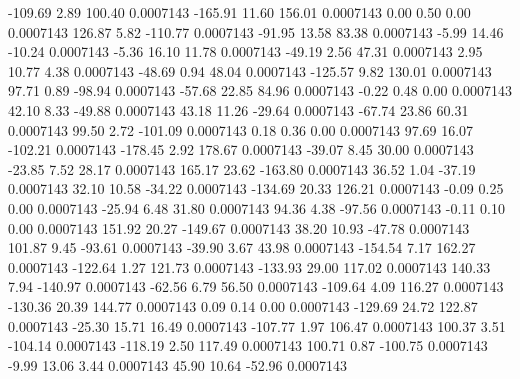      -109.69        2.89      100.40     0.0007143
     -165.91       11.60      156.01     0.0007143
        0.00        0.50        0.00     0.0007143
      126.87        5.82     -110.77     0.0007143
      -91.95       13.58       83.38     0.0007143
       -5.99       14.46      -10.24     0.0007143
       -5.36       16.10       11.78     0.0007143
      -49.19        2.56       47.31     0.0007143
        2.95       10.77        4.38     0.0007143
      -48.69        0.94       48.04     0.0007143
     -125.57        9.82      130.01     0.0007143
       97.71        0.89      -98.94     0.0007143
      -57.68       22.85       84.96     0.0007143
       -0.22        0.48        0.00     0.0007143
       42.10        8.33      -49.88     0.0007143
       43.18       11.26      -29.64     0.0007143
      -67.74       23.86       60.31     0.0007143
       99.50        2.72     -101.09     0.0007143
        0.18        0.36        0.00     0.0007143
       97.69       16.07     -102.21     0.0007143
     -178.45        2.92      178.67     0.0007143
      -39.07        8.45       30.00     0.0007143
      -23.85        7.52       28.17     0.0007143
      165.17       23.62     -163.80     0.0007143
       36.52        1.04      -37.19     0.0007143
       32.10       10.58      -34.22     0.0007143
     -134.69       20.33      126.21     0.0007143
       -0.09        0.25        0.00     0.0007143
      -25.94        6.48       31.80     0.0007143
       94.36        4.38      -97.56     0.0007143
       -0.11        0.10        0.00     0.0007143
      151.92       20.27     -149.67     0.0007143
       38.20       10.93      -47.78     0.0007143
      101.87        9.45      -93.61     0.0007143
      -39.90        3.67       43.98     0.0007143
     -154.54        7.17      162.27     0.0007143
     -122.64        1.27      121.73     0.0007143
     -133.93       29.00      117.02     0.0007143
      140.33        7.94     -140.97     0.0007143
      -62.56        6.79       56.50     0.0007143
     -109.64        4.09      116.27     0.0007143
     -130.36       20.39      144.77     0.0007143
        0.09        0.14        0.00     0.0007143
     -129.69       24.72      122.87     0.0007143
      -25.30       15.71       16.49     0.0007143
     -107.77        1.97      106.47     0.0007143
      100.37        3.51     -104.14     0.0007143
     -118.19        2.50      117.49     0.0007143
      100.71        0.87     -100.75     0.0007143
       -9.99       13.06        3.44     0.0007143
       45.90       10.64      -52.96     0.0007143
